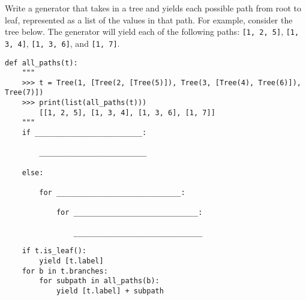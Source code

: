 \begin{blocksection}
\question Write a generator that takes in a tree and yields each possible path from root to leaf, represented as a list of the values in that path.
\newline
For example, consider the tree below. The generator will yield each of the following paths: \lstinline{[1, 2, 5]}, \lstinline{[1, 3, 4]}, \lstinline{[1, 3, 6]}, and \lstinline{[1, 7]}.
\newline
{}
\newline
\begin{lstlisting}
def all_paths(t):
    """
    >>> t = Tree(1, [Tree(2, [Tree(5)]), Tree(3, [Tree(4), Tree(6)]), Tree(7)])
    >>> print(list(all_paths(t)))
        [[1, 2, 5], [1, 3, 4], [1, 3, 6], [1, 7]]
    """    
    if _________________________:

        _________________________

    else:

        for _____________________________:

            for _____________________________:

                ______________________________
\end{lstlisting}

\begin{solution}[0.5in]
\begin{lstlisting}
    if t.is_leaf():
        yield [t.label]
    for b in t.branches:
        for subpath in all_paths(b):
            yield [t.label] + subpath
\end{lstlisting}

\end{solution}
\end{blocksection}
